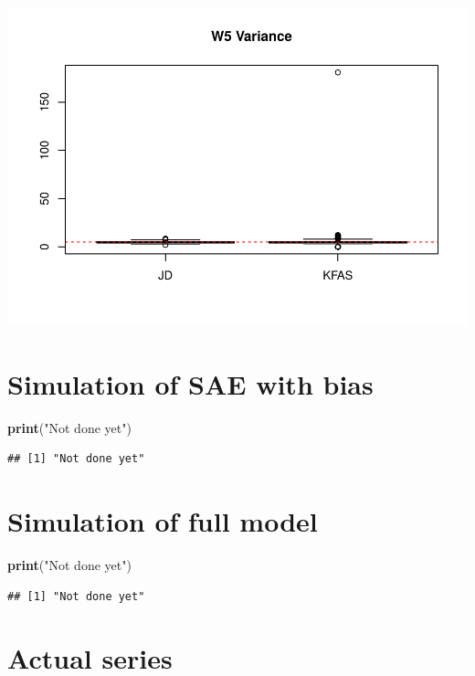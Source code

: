 \documentclass[]{article}
\newenvironment{Shaded}{\begin{snugshade}}{\end{snugshade}}
\newcommand{\KeywordTok}[1]{\textcolor[rgb]{0.13,0.29,0.53}{\textbf{#1}}}
\newcommand{\StringTok}[1]{\textcolor[rgb]{0.31,0.60,0.02}{#1}}
\newcommand{\NormalTok}[1]{#1}
\begin{document}
\includegraphics{simulation_test_files/figure-latex/simulate_sae-8.pdf}

\section{Simulation of SAE with bias}\label{simulation-of-sae-with-bias}

\begin{Shaded}
\begin{Highlighting}[]
\KeywordTok{print}\NormalTok{(}\StringTok{"Not done yet"}\NormalTok{)}
\end{Highlighting}
\end{Shaded}

\begin{verbatim}
## [1] "Not done yet"
\end{verbatim}

\section{Simulation of full model}\label{simulation-of-full-model}

\begin{Shaded}
\begin{Highlighting}[]
\KeywordTok{print}\NormalTok{(}\StringTok{"Not done yet"}\NormalTok{)}
\end{Highlighting}
\end{Shaded}

\begin{verbatim}
## [1] "Not done yet"
\end{verbatim}

\section{Actual series}\label{actual-series}
\end{document}
